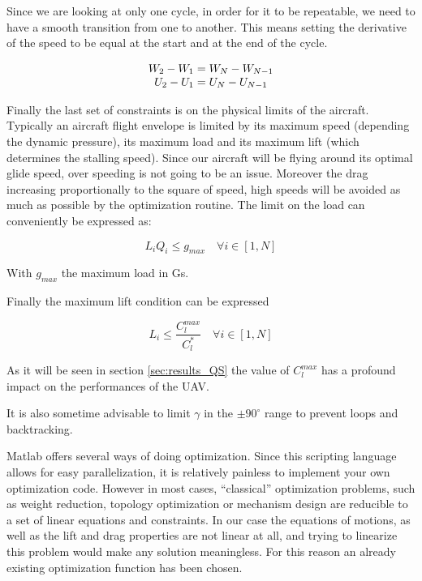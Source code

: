 \par Since we are looking at only one cycle, in order for it to be repeatable, we need to have a smooth transition from one to another.
This means setting the derivative of the speed to be equal at the start and at the end of the cycle.

\begin{equation}
  \begin{array}[c]{c}
    W_2 - W_1 = W_N - W_{N-1} \\
    U_2 - U_1 = U_N - U_{N-1} 
  \end{array}
  \label{eqn:derivative_constraint}
\end{equation}

\par Finally the last set of constraints is on the physical limits of the aircraft.
Typically an aircraft flight envelope is limited by its maximum speed (depending the dynamic pressure), its maximum load and its maximum lift (which determines the stalling speed).
Since our aircraft will be flying around its optimal glide speed, over speeding is not going to be an issue.
Moreover the drag increasing proportionally to the square of speed, high speeds will be avoided as much as possible by the optimization routine.
The limit on the load can conveniently be expressed as:

\begin{equation}
  L_i Q_i \leq g_{max} \quad \forall i \in [1,N]
  \label{eqn:load_constraint}
\end{equation}

With $g_{max}$ the maximum load in Gs.


\par Finally the maximum lift condition can be expressed

\begin{equation}
  L_i \le \frac{C_l^{max}}{C_l^*} \quad \forall i \in [1,N]
  \label{eqn:lift_constraint}
\end{equation}

As it will be seen in section \ref{sec:results_QS} the value of $C_l^{max}$ has a profound impact on the performances of the UAV.

\par It is also sometime advisable to limit $\gamma$ in the $\pm 90^{\circ}$ range to prevent loops and backtracking.


Matlab offers several ways of doing optimization.
Since this scripting language allows for easy parallelization, it is relatively painless to implement your own optimization code.
However in most cases, ``classical'' optimization problems, such as weight reduction, topology optimization or mechanism design are reducible to a set of linear equations and constraints.
In our case the equations of motions, as well as the lift and drag properties are not linear at all, and trying to linearize this problem would make any solution meaningless.
For this reason an already existing optimization function has been chosen.

